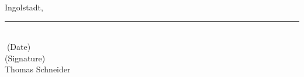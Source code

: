 



Ingolstadt, \rule{0.3\textwidth}{0.4pt}	\\
\textcolor{white}{.}\qquad\qquad\qquad\qquad\quad \small (Date) \\ [1.3cm]

(Signature) \\
Thomas Schneider
